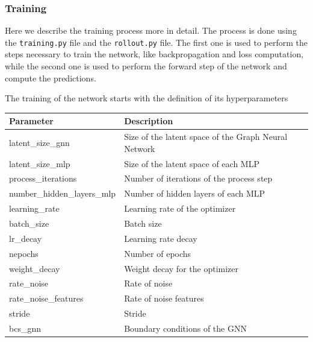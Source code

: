 \documentclass[11pt,a4paper]{article}
\begin{document}
\subsubsection*{Training}

Here we describe the training process more in detail. The process is done using the \texttt{training.py} file and the \texttt{rollout.py} file. The first one is used to perform the steps necessary to train the network, like backpropagation and loss computation, while the second one is used to perform the forward step of the network and compute the predictions.

The training of the network starts with the definition of its hyperparameters 



\begin{table}[ht]
\centering
\begin{tabular}{|l|l|}
\hline
\textbf{Parameter} & \textbf{Description} \\
\hline
latent\_size\_gnn & Size of the latent space of the Graph Neural Network \\
latent\_size\_mlp & Size of the latent space of each MLP \\
process\_iterations & Number of iterations of the process step \\
number\_hidden\_layers\_mlp & Number of hidden layers of each MLP \\
learning\_rate & Learning rate of the optimizer \\
batch\_size & Batch size \\
lr\_decay & Learning rate decay \\
nepochs & Number of epochs \\
weight\_decay & Weight decay for the optimizer \\
rate\_noise & Rate of noise \\
rate\_noise\_features & Rate of noise features \\
stride & Stride \\
bcs\_gnn & Boundary conditions of the GNN \\
\hline
\end{tabular}
\end{table}
\end{document}
